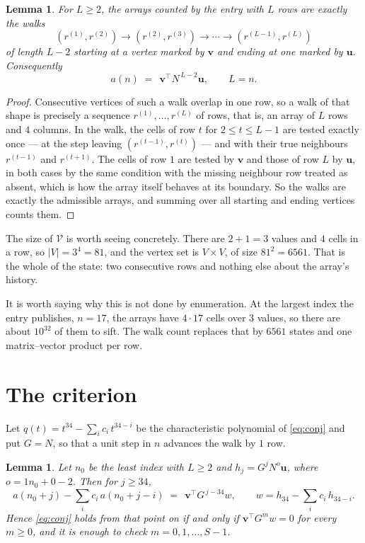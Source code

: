 \documentclass[11pt,a4paper]{article}
\theoremstyle{plain}
\newtheorem{lemma}[theorem]{Lemma}
\theoremstyle{definition}
\begin{document}
\begin{lemma}\label{lem:walk}
For $L\ge2$, the arrays counted by the entry with $L$ rows are exactly the walks
\[
(r^{(1)},r^{(2)})\to(r^{(2)},r^{(3)})\to\cdots\to(r^{(L-1)},r^{(L)})
\]
of length $L-2$ starting at a vertex marked by $\mathbf{v}$ and ending at one marked by
$\mathbf{u}$. Consequently
\[
a(n)\;=\;\,\mathbf{v}^{\!\top}N^{\,L-2}\mathbf{u},\qquad L=n .
\]
\end{lemma}

\begin{proof}
Consecutive vertices of such a walk overlap in one row, so a walk of that shape is
precisely a sequence $r^{(1)},\dots,r^{(L)}$ of rows, that is, an array of $L$ rows
and $4$ columns. In the walk, the cells of row $t$ for $2\le t\le L-1$ are tested
exactly once --- at the step leaving $(r^{(t-1)},r^{(t)})$ --- and with their true
neighbours $r^{(t-1)}$ and $r^{(t+1)}$. The cells of row $1$ are tested by
$\mathbf{v}$ and those of row $L$ by $\mathbf{u}$, in both cases by the same condition
with the missing neighbour row treated as absent, which is how the array itself behaves at
its boundary. So the walks are exactly the admissible arrays, and summing over all starting
and ending vertices counts them.
\end{proof}


The size of $\mathcal V$ is worth seeing concretely. There are $2+1=3$ values
and $4$ cells in a row, so $|V|=3^{4}=81$, and the vertex set is
$V\times V$, of size $81^2=6561$. That is the whole of the state: two consecutive
rows and nothing else about the array's history.

It is worth saying why this is not done by enumeration. At the largest index the entry
publishes, $n=17$, the arrays have $4\cdot17$ cells over
$3$ values, so there are about $10^{32}$ of them to sift. The
walk count replaces that by $6561$ states and one matrix--vector product per row.
\section{The criterion}

Let $q(t)=t^{34}-\sum_i c_i\,t^{34-i}$ be the characteristic polynomial of
\eqref{eq:conj} and put $G=N$, so that a unit step in $n$ advances the walk by
$1$ row.

\begin{lemma}\label{lem:crit}
Let $n_0$ be the least index with $L\ge2$ and $h_j=G^{j}N^{o}\mathbf{u}$, where
$o=1n_0+0-2$. Then for $j\ge34$,
\[
a(n_0+j)-\sum_i c_i\,a(n_0+j-i)\;=\;\,\mathbf{v}^{\!\top}G^{\,j-34}w,
\qquad w=h_{34}-\sum_i c_i\,h_{34-i} .
\]
Hence \eqref{eq:conj} holds from that point on if and only if
$\mathbf{v}^{\!\top}G^{m}w=0$ for every $m\ge0$, and it is enough to check
$m=0,1,\dots,S-1$.
\end{lemma}
\end{document}
